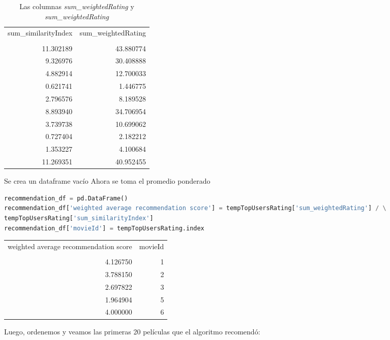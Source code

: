 \documentclass{uimppracticas}
\begin{document}
\begin{table}[H]
	\centering
	\begin{tabular}{rr}
		\toprule
		sum\_similarityIndex &  sum\_weightedRating \\
		&                     \\
		\midrule
		11.302189 &           43.880774 \\
		9.326976 &           30.408888 \\
		4.882914 &           12.700033 \\
		0.621741 &            1.446775 \\
		2.796576 &            8.189528 \\
		8.893940 &           34.706954 \\
		3.739738 &           10.699062 \\
		0.727404 &            2.182212 \\
		1.353227 &            4.100684 \\
		11.269351 &           40.952455 \\
		\bottomrule
	\end{tabular}
	\caption{Las columnas \textit{sum\_weightedRating} y \textit{ sum\_weightedRating}}
	\label{sums}
\end{table}

Se crea un dataframe vacío
Ahora se toma el promedio ponderado

\begin{lstlisting}[language=python, basicstyle=\small]
recommendation_df = pd.DataFrame()
recommendation_df['weighted average recommendation score'] = tempTopUsersRating['sum_weightedRating'] / \
tempTopUsersRating['sum_similarityIndex']
recommendation_df['movieId'] = tempTopUsersRating.index
\end{lstlisting}

\begin{tabular}{rr}
	\toprule
	weighted average recommendation score &  movieId \\
	&          \\
	\midrule
	4.126750 &        1 \\
	3.788150 &        2 \\
	2.697822 &        3 \\
	1.964904 &        5 \\
	4.000000 &        6 \\
	\bottomrule
\end{tabular}


Luego, ordenemos y veamos las primeras 20 películas que el algoritmo recomendó:
\end{document}
